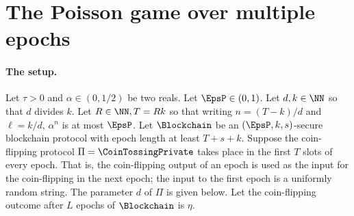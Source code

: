 






































\section{The Poisson game over multiple epochs}




\paragraph{The setup.} 
Let $\tau > 0$ and $\alpha \in (0, 1/2)$ be two reals. 
Let $\EpsP \in (0, 1)$. 
Let $d, k \in \NN$ 
so that $d$ divides $k$. 
Let $R \in \NN, T = Rk$ so that 
writing $n = (T - k)/d$ and $\ell = k/d$, 
$\alpha^n$ is at most $\EpsP$. 
Let $\Blockchain$ be an $(\EpsP, k, s)$-secure blockchain protocol 
with epoch length at least $T + s + k$. 
Suppose the	coin-flipping protocol $\Pi = \CoinTossingPrivate$ 
takes place in the first $T$ slots of every epoch. 
That is, the coin-flipping output of an epoch is used 
as the input for the coin-flipping in the next epoch; 
the input to the first epoch is a uniformly random string. 
The parameter $d$ of $\Pi$ is given below.
Let the coin-flipping outcome after $L$ epochs of $\Blockchain$ is $\eta$.

